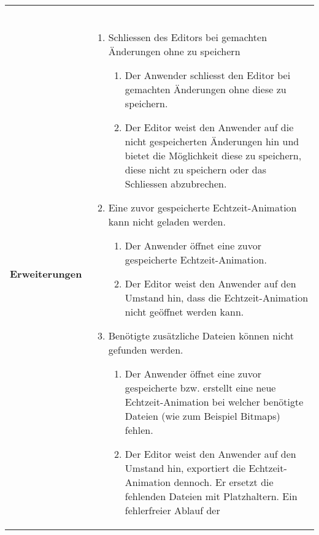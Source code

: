 \begin{longtabu}{p{0.5\textwidth}p{0.5\textwidth}}
\begin{enumerate}
        \end{enumerate} \\
    \cmidrule(r){1-1}\cmidrule(lr){2-2}
        \textbf{Erweiterungen} &
        \begin{enumerate}[label= (\alph*)]
            \item{Schliessen des Editors bei gemachten Änderungen ohne zu
                    speichern
                \begin{enumerate}[label= (\roman*)]
                    \item{Der Anwender schliesst den Editor bei gemachten
                            Änderungen ohne diese zu speichern.}
                    \item{Der Editor weist den Anwender auf die
                            nicht gespeicherten Änderungen hin und bietet
                            die Möglichkeit diese zu speichern, diese nicht
                            zu speichern oder das Schliessen abzubrechen.}
                \end{enumerate}
            }
            \item{Eine zuvor gespeicherte Echtzeit-Animation kann nicht
                    geladen werden.
                \begin{enumerate}[label= (\roman*)]
                    \item{Der Anwender öffnet eine zuvor gespeicherte
                            Echtzeit-Animation.}
                    \item{Der Editor weist den Anwender auf den Umstand
                            hin, dass die Echtzeit-Animation nicht geöffnet
                            werden kann.}
                \end{enumerate}
            }
            \item{Benötigte zusätzliche Dateien können nicht gefunden
                    werden.
                \begin{enumerate}[label= (\roman*)]
                    \item{Der Anwender öffnet eine zuvor gespeicherte bzw.
                            erstellt eine neue Echtzeit-Animation bei
                            welcher benötigte Dateien (wie zum Beispiel
                            Bitmaps) fehlen.}
                    \item{Der Editor weist den Anwender auf den Umstand
                            hin, exportiert die Echtzeit-Animation dennoch. Er
                            ersetzt die fehlenden Dateien mit
                            Platzhaltern. Ein fehlerfreier Ablauf der
}
\end{enumerate}}
\end{enumerate}
\end{longtabu}
